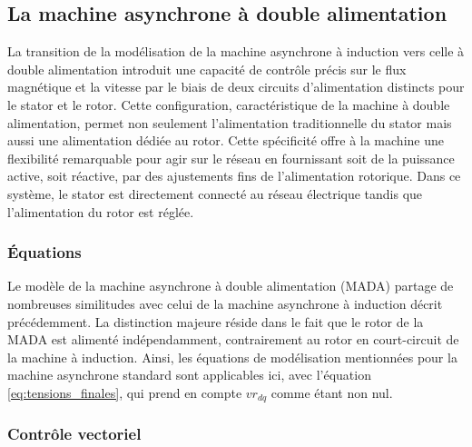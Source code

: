  
\FloatBarrier
\subsection{La machine asynchrone à double alimentation}

La transition de la modélisation de la machine asynchrone à induction vers celle à double alimentation introduit une capacité de contrôle précis sur le flux magnétique et la vitesse par le biais de deux circuits d'alimentation distincts pour le stator et le rotor. Cette configuration, caractéristique de la machine à double alimentation, permet non seulement l'alimentation traditionnelle du stator mais aussi une alimentation dédiée au rotor. Cette spécificité offre à la machine une flexibilité remarquable pour agir sur le réseau en fournissant soit de la puissance active, soit réactive, par des ajustements fins de l'alimentation rotorique. Dans ce système, le stator est directement connecté au réseau électrique tandis que l'alimentation du rotor est réglée. 

\FloatBarrier
\subsubsection{Équations}

Le modèle de la machine asynchrone à double alimentation (MADA) partage de nombreuses similitudes avec celui de la machine asynchrone à induction décrit précédemment. La distinction majeure réside dans le fait que le rotor de la MADA est alimenté indépendamment, contrairement au rotor en court-circuit de la machine à induction. Ainsi, les équations de modélisation mentionnées pour la machine asynchrone standard sont applicables ici, avec l'équation \ref{eq:tensions_finales}, qui prend en compte \(vr_{dq}\) comme étant non nul.

\FloatBarrier
\subsubsection{Contrôle vectoriel}

